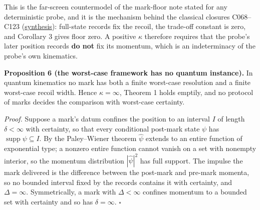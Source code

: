 \documentclass[11pt,a4paper]{article}
\begin{document}
This is the far-screen countermodel of the mark-floor note stated for
any deterministic probe, and it is the mechanism behind the classical
closures C068--C123 (\href{action-scale-obstructions.md}{synthesis}):
full-state records fix the recoil, the trade-off constant is zero, and
Corollary 3 gives floor zero. A positive \(\kappa\) therefore requires
that the probe's later position records \textbf{do not} fix its
momentum, which is an indeterminacy of the probe's own kinematics.

\textbf{Proposition 6 (the worst-case framework has no quantum
instance).} In quantum kinematics no mark has both a finite worst-case
resolution and a finite worst-case recoil width. Hence
\(\kappa=\infty\), Theorem 1 holds emptily, and no protocol of marks
decides the comparison with worst-case certainty.

\emph{Proof.} Suppose a mark's datum confines the position to an
interval \(I\) of length \(\delta<\infty\) with certainty, so that every
conditional post-mark state \(\psi\) has
\(\operatorname{supp}\psi\subseteq I\). By the Paley--Wiener theorem
\(\hat\psi\) extends to an entire function of exponential type; a
nonzero entire function cannot vanish on a set with nonempty interior,
so the momentum distribution \(|\hat\psi|^2\) has full support. The
impulse the mark delivered is the difference between the post-mark and
pre-mark momenta, so no bounded interval fixed by the records contains
it with certainty, and \(\Delta=\infty\). Symmetrically, a mark with
\(\Delta<\infty\) confines momentum to a bounded set with certainty and
so has \(\delta=\infty\). \(\square\)
\end{document}
